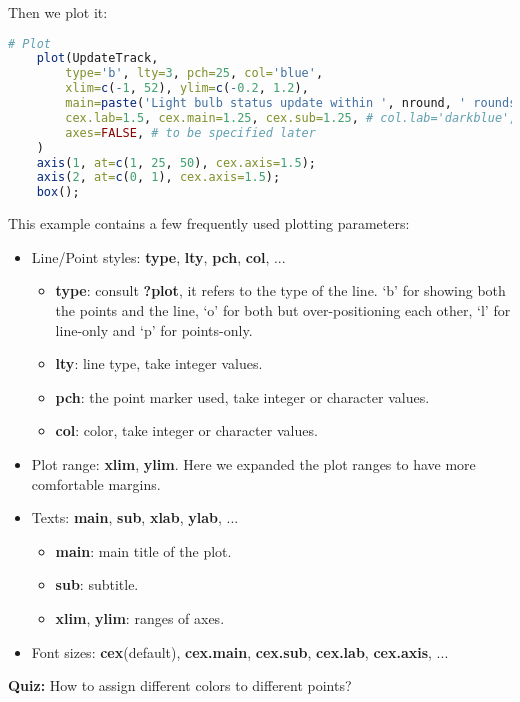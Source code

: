 \documentclass[10pt]{article}
\begin{document}
Then we plot it:
\begin{lstlisting}[style=displaycode, language=R]
	# Plot
	plot(UpdateTrack,
		type='b', lty=3, pch=25, col='blue',
		xlim=c(-1, 52), ylim=c(-0.2, 1.2),
		main=paste('Light bulb status update within ', nround, ' rounds', sep=''), sub='An on-off process illustration', xlab='Index', ylab='Status',
		cex.lab=1.5, cex.main=1.25, cex.sub=1.25, # col.lab='darkblue',
		axes=FALSE, # to be specified later
	)
	axis(1, at=c(1, 25, 50), cex.axis=1.5);
	axis(2, at=c(0, 1), cex.axis=1.5);
	box();
\end{lstlisting}
This example contains a few frequently used plotting parameters:
	\begin{itemize}
		\item Line/Point styles: {\bf type}, {\bf lty}, {\bf pch}, {\bf col}, ...
		\begin{itemize}
			\item {\bf type}: consult {\bf ?plot}, it refers to the type of the line. `b' for showing both the points and the line, `o' for both but over-positioning each other, `l' for line-only and `p' for points-only.
			\item {\bf lty}: line type, take integer values.
			\item {\bf pch}: the point marker used, take integer or character values.
			\item {\bf col}: color, take integer or character values.
		\end{itemize}
		\item Plot range: {\bf xlim}, {\bf ylim}. Here we expanded the plot ranges to have more comfortable margins.
		\item Texts: {\bf main}, {\bf sub}, {\bf xlab}, {\bf ylab}, ...
		\begin{itemize}
			\item {\bf main}: main title of the plot.
			\item {\bf sub}: subtitle.
			\item {\bf xlim}, {\bf ylim}: ranges of axes.
		\end{itemize}
		\item Font sizes: {\bf cex}(default), {\bf cex.main}, {\bf cex.sub}, {\bf cex.lab}, {\bf cex.axis}, ...
	\end{itemize}
	{\bf Quiz:} How to assign different colors to different points?
\end{document}
